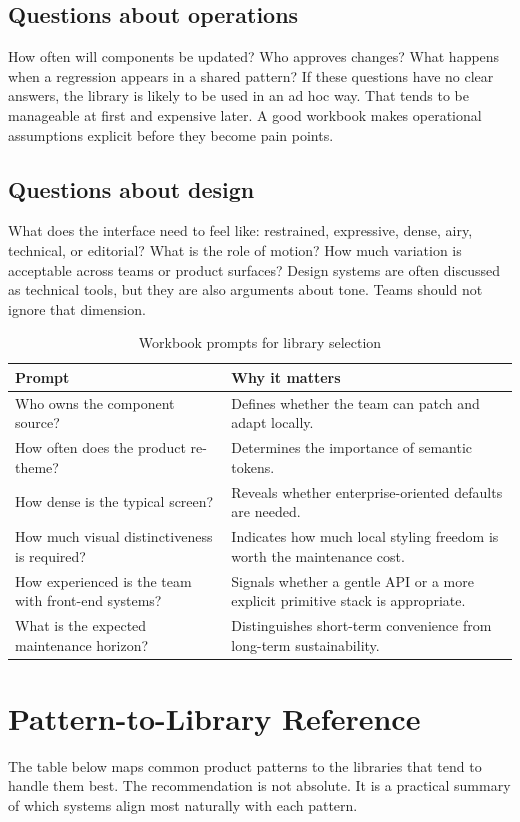 \documentclass[11pt,twoside,a4paper]{article}
\begin{document}
\subsection{Questions about operations}
How often will components be updated? Who approves changes? What happens when a regression appears in a shared pattern? If these questions have no clear answers, the library is likely to be used in an ad hoc way. That tends to be manageable at first and expensive later. A good workbook makes operational assumptions explicit before they become pain points.

\subsection{Questions about design}
What does the interface need to feel like: restrained, expressive, dense, airy, technical, or editorial? What is the role of motion? How much variation is acceptable across teams or product surfaces? Design systems are often discussed as technical tools, but they are also arguments about tone. Teams should not ignore that dimension.

\begin{table}[htbp]
  \centering
  \caption{Workbook prompts for library selection}
  \begin{tabularx}{\textwidth}{@{}p{}Y@{}}
    \toprule
    \textbf{Prompt} & \textbf{Why it matters} \\
    \midrule
    Who owns the component source? & Defines whether the team can patch and adapt locally. \\
    How often does the product re-theme? & Determines the importance of semantic tokens. \\
    How dense is the typical screen? & Reveals whether enterprise-oriented defaults are needed. \\
    How much visual distinctiveness is required? & Indicates how much local styling freedom is worth the maintenance cost. \\
    How experienced is the team with front-end systems? & Signals whether a gentle API or a more explicit primitive stack is appropriate. \\
    What is the expected maintenance horizon? & Distinguishes short-term convenience from long-term sustainability. \\
    \bottomrule
  \end{tabularx}
\end{table}

\section{Pattern-to-Library Reference}
The table below maps common product patterns to the libraries that tend to handle them best. The recommendation is not absolute. It is a practical summary of which systems align most naturally with each pattern.
\end{document}
